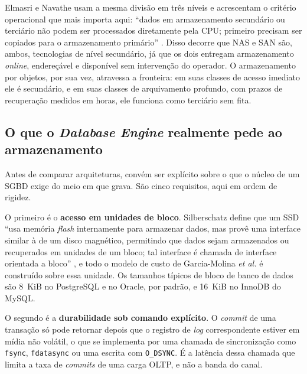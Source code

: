 \documentclass[11pt,a4paper]{article}
\begin{document}
Elmasri e Navathe usam a mesma divisão em três níveis e acrescentam o critério operacional que mais
importa aqui: ``dados em armazenamento secundário ou terciário não podem ser processados diretamente
pela CPU; primeiro precisam ser copiados para o armazenamento primário'' \cite{elmasri2018}. Disso
decorre que NAS e SAN são, ambos, tecnologias de nível secundário, já que os dois entregam
armazenamento \textit{online}, endereçável e disponível sem intervenção do operador. O armazenamento
por objetos, por sua vez, atravessa a fronteira: em suas classes de acesso imediato ele é
secundário, e em suas classes de arquivamento profundo, com prazos de recuperação medidos em horas,
ele funciona como terciário sem fita.

\subsection{O que o \textit{Database Engine} realmente pede ao armazenamento}
\label{sec:engine}

Antes de comparar arquiteturas, convém ser explícito sobre o que o núcleo de um SGBD exige do meio
em que grava. São cinco requisitos, aqui em ordem de rigidez.

O primeiro é o \textbf{acesso em unidades de bloco}. Silberschatz define que um SSD ``usa memória
\textit{flash} internamente para armazenar dados, mas provê uma interface similar à de um disco
magnético, permitindo que dados sejam armazenados ou recuperados em unidades de um bloco; tal
interface é chamada de interface orientada a bloco'' \cite{silberschatz2020}, e todo o modelo de
custo de Garcia-Molina \textit{et al.} \cite{garciamolina2008} é construído sobre essa unidade. Os
tamanhos típicos de bloco de banco de dados são 8~KiB no PostgreSQL e no Oracle, por padrão, e
16~KiB no InnoDB do MySQL.

O segundo é a \textbf{durabilidade sob comando explícito}. O \textit{commit} de uma transação só pode
retornar depois que o registro de \textit{log} correspondente estiver em mídia não volátil, o que se
implementa por uma chamada de sincronização como \texttt{fsync}, \texttt{fdatasync} ou uma escrita
com \texttt{O\_DSYNC}. É a latência dessa chamada que limita a taxa de \textit{commits} de uma carga
OLTP, e não a banda do canal.
\end{document}
